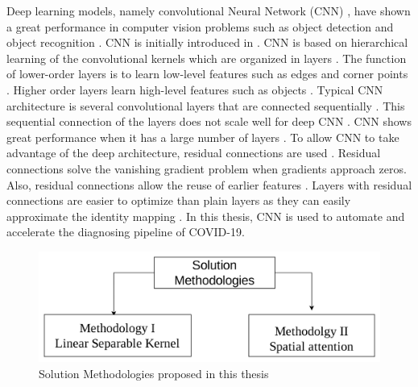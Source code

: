 Deep learning \cite{lecun2015deep} models, namely convolutional Neural Network (CNN) \cite{lecun1989handwritten}, have shown a great performance in computer vision problems such as object detection \cite{erhan2014scalable}\cite{girshick2014rich}\cite{sermanet2013overfeat}\cite{redmon2016you} and object recognition \cite{simonyan2014very}\cite{he2016deep}. CNN is initially introduced in \cite{lecun1989handwritten}. CNN  is based on hierarchical learning of the convolutional kernels which are organized in layers \cite{krizhevsky2012imagenet}. The function of lower-order layers is to learn low-level features such as edges and corner points \cite{zeiler2014visualizing}. Higher order layers learn high-level features such as objects \cite{zeiler2014visualizing}. Typical CNN architecture is several convolutional layers that are connected sequentially \cite{simonyan2014very}. This sequential connection of the layers does not scale well for deep CNN \cite{he2016deep}. CNN shows great performance when it has a large number of layers \cite{he2016deep}. To allow CNN to take advantage of the deep architecture, residual connections are used \cite{he2016deep}. Residual connections solve the vanishing gradient problem when gradients approach zeros. Also, residual connections allow the reuse of earlier features \cite{huang2017densely}. Layers with residual connections are easier to optimize than plain layers as they can easily approximate the identity mapping \cite{he2016deep}. In this thesis, CNN is used to automate and accelerate the diagnosing pipeline of COVID-19.


\begin{figure}%
    \centering
        \includegraphics[width=\textwidth]{Figures/SolutionMethodologies.png}
        \caption{Solution Methodologies proposed in this thesis}
        \label{solMeth}
\end{figure}


